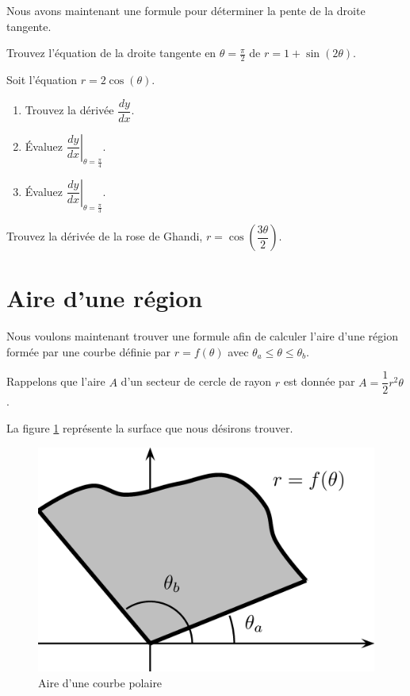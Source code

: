 \documentclass[]{book}
\providecommand{\tightlist}{%
  \setlength{\itemsep}{0pt}\setlength{\parskip}{0pt}}
\theoremstyle{definition}
\theoremstyle{definition}
\theoremstyle{definition}
\theoremstyle{remark}
\let\BeginKnitrBlock\begin \let\EndKnitrBlock\end
\begin{document}
Nous avons maintenant une formule pour déterminer la pente de la droite
tangente.

\BeginKnitrBlock{example}
\protect\hypertarget{exm:unnamed-chunk-106}{}{\label{exm:unnamed-chunk-106}
}Trouvez l'équation de la droite tangente en \(\theta=\frac{\pi}{2}\) de
\(r=1+\sin(2\theta)\).
\EndKnitrBlock{example}
\vspace*{8cm}

\BeginKnitrBlock{example}
\protect\hypertarget{exm:unnamed-chunk-107}{}{\label{exm:unnamed-chunk-107}
}Soit l'équation \(r=2\cos(\theta)\).

\begin{enumerate}
\def\labelenumi{\alph{enumi}.}
\tightlist
\item
  Trouvez la dérivée \(\dfrac{dy}{dx}\).
\item
  Évaluez \(\left.\dfrac{dy}{dx}\right|_{\theta=\frac{\pi}{4}}\).
\item
  Évaluez \(\left.\dfrac{dy}{dx}\right|_{\theta=\frac{\pi}{3}}\).
\end{enumerate}
\EndKnitrBlock{example}
\vspace*{10cm}

\BeginKnitrBlock{example}
\protect\hypertarget{exm:unnamed-chunk-108}{}{\label{exm:unnamed-chunk-108}
}Trouvez la dérivée de la rose de Ghandi,
\(r=\cos\left(\dfrac{3\theta}{2}\right)\).
\EndKnitrBlock{example}
\vspace*{6cm}

\hypertarget{aire-dune-region}{%
\section{Aire d'une région}\label{aire-dune-region}}

Nous voulons maintenant trouver une formule afin de calculer l'aire
d'une région formée par une courbe définie par \(r=f(\theta)\) avec
\(\theta_a\leq \theta \leq \theta_b\).

Rappelons que l'aire \(A\) d'un secteur de cercle de rayon \(r\) est
donnée par \(A=\dfrac{1}{2}r^2\theta\).

La figure \ref{fig:airepolaire1} représente la surface que nous désirons
trouver.

\begin{figure}

{\centering \includegraphics[width=0.5\linewidth]{resources/images/latex/airepolaire1} 

}

\caption{Aire d'une courbe polaire}\label{fig:airepolaire1}
\end{figure}
\end{document}
